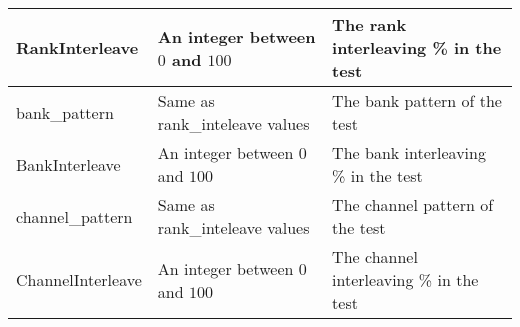 \begin{table*}[ht]
\begin{tabular}{|l|p{1.2cm}|p{7cm}|p{4cm}|}
 \hline
 RankInterleave & \multicolumn{2}{l|}{An integer between $0$ and $100$} & The rank interleaving \%  in the test\\
 
 \hline
 
bank\_pattern &  \multicolumn{2}{l|}{Same as rank\_inteleave values} & The bank pattern of the test\\

 \hline
 BankInterleave & \multicolumn{2}{l|}{An integer between $0$ and $100$} & The bank interleaving \%  in the test\\
  \hline
 
channel\_pattern &  \multicolumn{2}{l|}{Same as rank\_inteleave values} & The channel pattern of the test\\

 \hline
 ChannelInterleave & \multicolumn{2}{l|}{An integer between $0$ and $100$} & The channel interleaving \% in the test\\
 
%

  \hline
\end{tabular}
\label{tb:vars}
\end{table*}